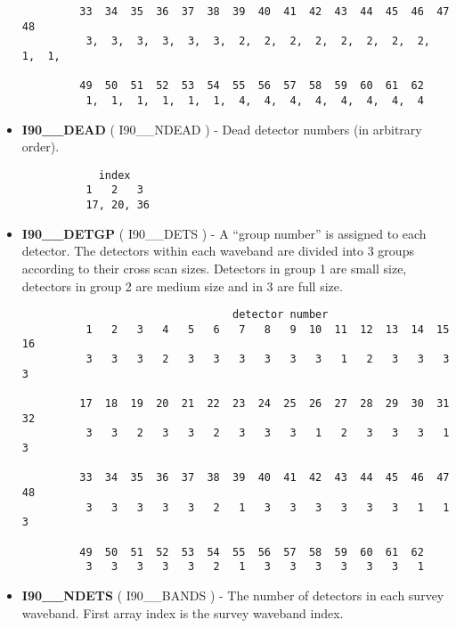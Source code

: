 \begin{itemize}
\begin{minipage}[t]{\textwidth}
\begin{verbatim}
         33  34  35  36  37  38  39  40  41  42  43  44  45  46  47  48
          3,  3,  3,  3,  3,  3,  2,  2,  2,  2,  2,  2,  2,  2,  1,  1,

         49  50  51  52  53  54  55  56  57  58  59  60  61  62
          1,  1,  1,  1,  1,  1,  4,  4,  4,  4,  4,  4,  4,  4
\end{verbatim}
\normalsize
\end{minipage}

\item {\bf I90\_\_DEAD} ( I90\_\_NDEAD ) - Dead detector numbers (in arbitrary order).

\begin{minipage}[t]{\textwidth}
\small
\begin{verbatim}
            index
          1   2   3
          17, 20, 36
\end{verbatim}
\normalsize
\end{minipage}

\item {\bf I90\_\_DETGP} ( I90\_\_DETS ) - A ``group number'' is assigned to
each detector. The detectors within each waveband are divided into 3 groups
according to their cross scan sizes. Detectors in group 1 are small size,
detectors in group 2 are medium size and in 3 are full size.

\begin{minipage}[t]{\textwidth}
\small
\begin{verbatim}
                                 detector number
          1   2   3   4   5   6   7   8   9  10  11  12  13  14  15  16
          3   3   3   2   3   3   3   3   3   3   1   2   3   3   3   3

         17  18  19  20  21  22  23  24  25  26  27  28  29  30  31  32
          3   3   2   3   3   2   3   3   3   1   2   3   3   3   1   3

         33  34  35  36  37  38  39  40  41  42  43  44  45  46  47  48
          3   3   3   3   3   2   1   3   3   3   3   3   3   1   1   3

         49  50  51  52  53  54  55  56  57  58  59  60  61  62
          3   3   3   3   3   2   1   3   3   3   3   3   3   1
\end{verbatim}
\normalsize
\end{minipage}

\item {\bf I90\_\_NDETS} ( I90\_\_BANDS ) - The number of detectors in each survey
waveband. First array index is the survey waveband index.



\end{itemize}
